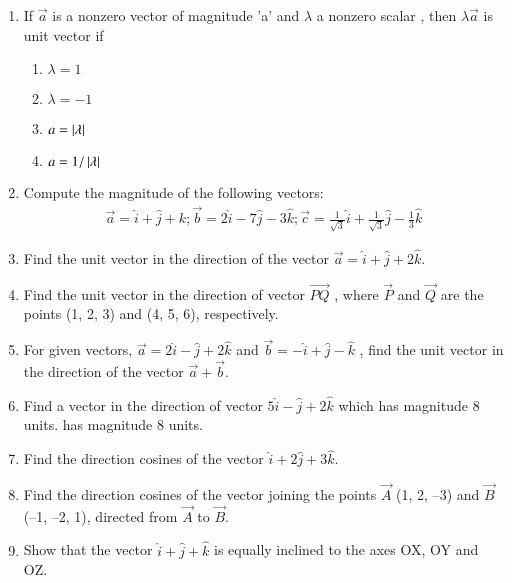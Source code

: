 \begin{enumerate}[label=\thesection.\arabic*,ref=\thesection.\theenumi]
\item If $\overrightarrow {a}$ is a nonzero vector of magnitude 'a' and $\lambda$ a nonzero scalar , then $\lambda\overrightarrow {a}$ is unit vector if
\begin{enumerate} 
\item $\lambda=1$ 
\item $\lambda=-1$
\item $a=\left\vert\lambda\right\vert$
\item $a=1/\left\vert\lambda\right\vert$  
\end{enumerate}
\item Compute the magnitude of the following vectors:
\begin{align*}
\vec{a}=\hat{i}+\hat{j}+k; \vec{b}=2\hat{i}-7\hat{j}-3\hat{k}; \vec{c}=\frac{1}{\sqrt{3}}\hat{i}+\frac{1}{\sqrt{3}}\hat{j}-\frac{1}{3}\hat{k}
\end{align*}
    \solution 
		
\item Find the unit vector in the direction of the vector $\vec{a}=\hat{i}+\hat{j}+2\hat{k}$.
\item Find the unit vector in the direction of vector $\overrightarrow{PQ}$ , where $\vec{P}$ and $\vec{Q}$ are the points
(1, 2, 3) and (4, 5, 6), respectively.
\item For given vectors, $\vec{a}=2\hat{i}-\hat{j}+2\hat{k}$ and $\vec{b}=-\hat{i}+\hat{j}-\hat{k}$ , find the unit vector in the
direction of the vector $\vec{a}+\vec{b}$.
\\
    \solution 
		
\item Find a vector in the direction of vector $5\hat{i}-\hat{j}+2\hat{k}$ which has magnitude 8 units.
    has magnitude 8 units.
   \\ 
    \solution 
		
\item Find the direction cosines of the vector $\hat{i}+2\hat{j}+3\hat{k}$.
	\\
    \solution 
		
\item Find the direction cosines of the vector joining the points $\vec{A}$ (1, 2, –3) and
$\vec{B}$(–1, –2, 1), directed from $\vec{A}$ to $\vec{B}$.
	\\
    \solution 
		
\item Show that the vector $\hat{i}+\hat{j}+\hat{k}$ is equally inclined to the axes OX, OY and OZ.

\end{enumerate}
